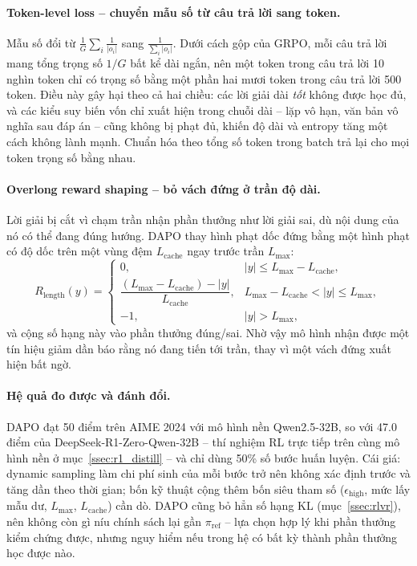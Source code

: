 \paragraph{Token-level loss -- chuyển mẫu số từ câu trả lời sang token.}
Mẫu số đổi từ $\frac{1}{G}\sum_i \frac{1}{|o_i|}$ sang $\frac{1}{\sum_i |o_i|}$. Dưới cách gộp của GRPO, mỗi câu trả lời mang tổng trọng số $1/G$ bất kể dài ngắn, nên một token trong câu trả lời 10 nghìn token chỉ có trọng số bằng một phần hai mươi token trong câu trả lời 500 token. Điều này gây hại theo cả hai chiều: các lời giải dài \emph{tốt} không được học đủ, và các kiểu suy biến vốn chỉ xuất hiện trong chuỗi dài -- lặp vô hạn, văn bản vô nghĩa sau đáp án -- cũng không bị phạt đủ, khiến độ dài và entropy tăng một cách không lành mạnh. Chuẩn hóa theo tổng số token trong batch trả lại cho mọi token trọng số bằng nhau.

\paragraph{Overlong reward shaping -- bỏ vách đứng ở trần độ dài.}
Lời giải bị cắt vì chạm trần nhận phần thưởng như lời giải sai, dù nội dung của nó có thể đang đúng hướng. DAPO thay hình phạt dốc đứng bằng một hình phạt có độ dốc trên một vùng đệm $L_{\mathrm{cache}}$ ngay trước trần $L_{\max}$:
\[
R_{\mathrm{length}}(y) =
\begin{cases}
0, & |y| \le L_{\max} - L_{\mathrm{cache}},\\[6pt]
\dfrac{(L_{\max} - L_{\mathrm{cache}}) - |y|}{L_{\mathrm{cache}}}, & L_{\max} - L_{\mathrm{cache}} < |y| \le L_{\max},\\[8pt]
-1, & |y| > L_{\max},
\end{cases}
\]
và cộng số hạng này vào phần thưởng đúng/sai. Nhờ vậy mô hình nhận được một tín hiệu giảm dần báo rằng nó đang tiến tới trần, thay vì một vách đứng xuất hiện bất ngờ.

\paragraph{Hệ quả đo được và đánh đổi.}
DAPO đạt 50 điểm trên AIME 2024 với mô hình nền Qwen2.5-32B, so với 47.0 điểm của DeepSeek-R1-Zero-Qwen-32B -- thí nghiệm RL trực tiếp trên cùng mô hình nền ở mục~\ref{ssec:r1_distill} -- và chỉ dùng 50\% số bước huấn luyện. Cái giá: dynamic sampling làm chi phí sinh của mỗi bước trở nên không xác định trước và tăng dần theo thời gian; bốn kỹ thuật cộng thêm bốn siêu tham số ($\epsilon_{\mathrm{high}}$, mức lấy mẫu dư, $L_{\max}$, $L_{\mathrm{cache}}$) cần dò. DAPO cũng bỏ hẳn số hạng KL (mục~\ref{ssec:rlvr}), nên không còn gì níu chính sách lại gần $\pi_{\mathrm{ref}}$ -- lựa chọn hợp lý khi phần thưởng kiểm chứng được, nhưng nguy hiểm nếu trong hệ có bất kỳ thành phần thưởng học được nào.


